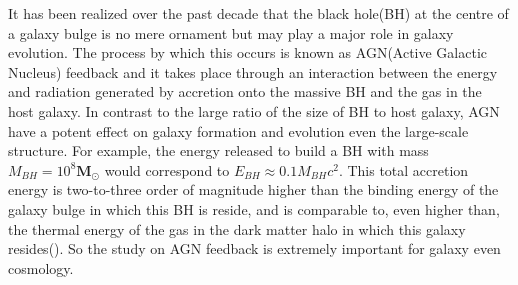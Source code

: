 \documentclass[../main.tex]{subfiles}
\begin{document}
It has been realized over the past decade that the black hole(BH) at the centre of a galaxy bulge is no mere ornament but may play a major role in galaxy evolution. The process by which this occurs is known as AGN(Active Galactic Nucleus) feedback and it takes place through an interaction between the energy and radiation generated by accretion onto the massive BH and the gas in the host galaxy. In contrast to the large ratio of the size of BH to host galaxy, AGN have a potent effect on galaxy formation and evolution even the large-scale structure. For example, the energy released to build a BH with mass $M_{BH}=10^{8} \mathbf{M}_{\odot}$ would correspond to $E_{BH} \approx 0.1M_{BH}c^{2}$. This total accretion energy is two-to-three order of magnitude higher than the binding energy of the galaxy bulge in which this BH is reside, and is comparable to, even higher than, the thermal energy of the gas in the dark matter halo in which this galaxy resides(\cite{harrison2016observational}). So the study on AGN feedback is extremely important for galaxy even cosmology.
\end{document}
